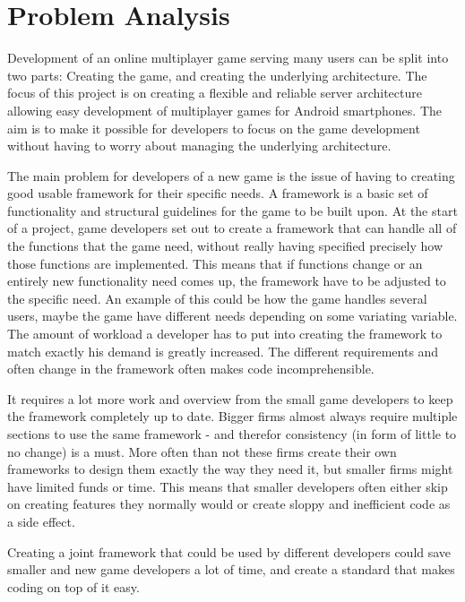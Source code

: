 \chapter{Problem Analysis}


Development of an online multiplayer game serving many users can be split into two parts: Creating the game, and creating the underlying architecture. The focus of this project is on creating a flexible and reliable server architecture  allowing easy development of multiplayer games for Android smartphones. The aim is to make it possible for developers to focus on the game development without having to worry about managing the underlying architecture. 

The main problem for developers of a new game is the issue of having to creating good usable framework for their specific needs. A framework is a basic set of functionality and structural guidelines for the game to be built upon. At the start of a project, game developers set out to create a framework that can handle all of the functions that the game need, without really having specified precisely how those functions are implemented. This means that if functions change or an entirely new functionality need comes up, the framework have to be adjusted to the specific need. An example of this could be how the game handles several users, maybe the game have different needs depending on some variating variable. The amount of workload a developer has to put into creating the framework to match exactly his demand is greatly increased. The different requirements and often change in the framework often makes code incomprehensible.

It requires a lot more work and overview from the small game developers to keep the framework completely up to date. Bigger firms almost always require multiple sections to use the same framework - and therefor consistency (in form of little to no change) is a must. More often than not these firms create their own frameworks to design them exactly the way they need it, but smaller firms might have limited funds or time. This means that smaller developers often either skip on creating features they normally would or create sloppy and inefficient code as a side effect.

Creating a joint framework that could be used by different developers could save smaller and new game developers a lot of time, and create a standard that makes coding on top of it easy. 

